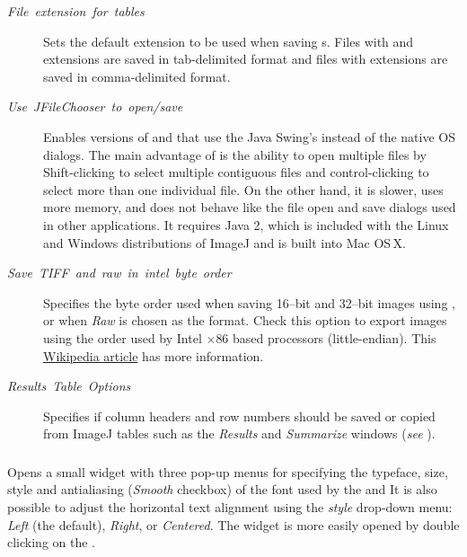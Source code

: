 \begin{description}
\item [{\emph{File}\ \emph{extension}\ \emph{for}\ \emph{tables}}] Sets
the default extension to be used when saving s.
Files with  and  extensions
are saved in tab-delimited format and files with 
extensions are saved in comma-delimited format.
\item [{\emph{Use}\ \emph{JFileChooser}\ \emph{to}\ \emph{open/save}}] Enables
versions of  and 
that use the Java Swing's 
instead of the native OS dialogs. The main advantage of 
is the ability to open multiple files by Shift-clicking to select
multiple contiguous files and control-clicking to select more than
one individual file. On the other hand, it is slower, uses more memory,
and does not behave like the file open and save dialogs used in other
applications. It requires Java 2, which is included with the Linux
and Windows distributions of ImageJ and is built into Mac OS\,X.
\item [{\emph{Save}\ \emph{TIFF}\ \emph{and}\ \emph{raw}\ \emph{in}\ \emph{intel}\ \emph{byte}\ \emph{order}}] Specifies
the byte order used when saving 16--bit and 32--bit images using ,
or 
when \emph{Raw} is chosen as the format. Check this option to export
images using the order used by Intel $\times$86 based processors
(little-endian). This \href{http://en.wikipedia.org/wiki/Endiannes}{Wikipedia article}
has more information. 
\item [{\emph{Results}\ \emph{Table}\ \emph{Options}}] Specifies if\emph{
}column headers\emph{ }and\emph{ }row numbers should be saved or copied
from ImageJ tables such as the \emph{Results} and \emph{Summarize}
windows (\emph{see} ).
\end{description}

\subsubsection{\protect{}\label{sub:Fonts...}}

Opens a small widget with three pop-up menus for specifying the typeface,
size, style and antialiasing (\emph{Smooth} checkbox) of the font
used by the  and 
It is also possible to adjust the horizontal text alignment using
the \emph{style} drop-down menu: \emph{Left} (the default), \emph{Right},
or \emph{Centered}. The widget is more easily opened by double clicking
on the .

